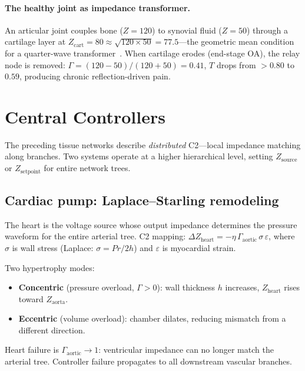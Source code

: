 \documentclass[aps,pre,twocolumn,superscriptaddress,floatfix]{revtex4-2}
\begin{document}
\paragraph{The healthy joint as impedance transformer.}
An articular joint couples bone ($Z = 120$) to
synovial fluid ($Z = 50$) through a cartilage layer
at $Z_{\text{cart}} = 80 \approx \sqrt{120 \times 50}
= 77.5$---the geometric mean condition for a
quarter-wave transformer~\cite{Pozar2011}.
When cartilage erodes (end-stage OA), the relay node
is removed: $\Gamma = (120-50)/(120+50) = 0.41$,
$T$ drops from $>0.80$ to $0.59$, producing
chronic reflection-driven pain.


\section{Central Controllers}
\label{sec:controllers}

The preceding tissue networks describe \emph{distributed}
C2---local impedance matching along branches.
Two systems operate at a higher hierarchical level,
setting $Z_{\text{source}}$ or $Z_{\text{setpoint}}$
for entire network trees.

\subsection{Cardiac pump: Laplace--Starling remodeling}

The heart is the voltage source whose output impedance
determines the pressure waveform for the entire arterial
tree.  C2 mapping:
$\Delta Z_{\text{heart}} = -\eta\,\Gamma_{\text{aortic}}
\,\sigma\,\varepsilon$,
where $\sigma$ is wall stress (Laplace:
$\sigma = Pr/2h$) and $\varepsilon$ is myocardial strain.

Two hypertrophy modes:
\begin{itemize}
  \item \textbf{Concentric} (pressure overload,
    $\Gamma > 0$): wall thickness $h$ increases,
    $Z_{\text{heart}}$ rises toward $Z_{\text{aorta}}$.
  \item \textbf{Eccentric} (volume overload):
    chamber dilates, reducing mismatch from a
    different direction.
\end{itemize}
Heart failure is $\Gamma_{\text{aortic}} \to 1$:
ventricular impedance can no longer match the
arterial tree.  Controller failure propagates to
all downstream vascular branches.
\end{document}
